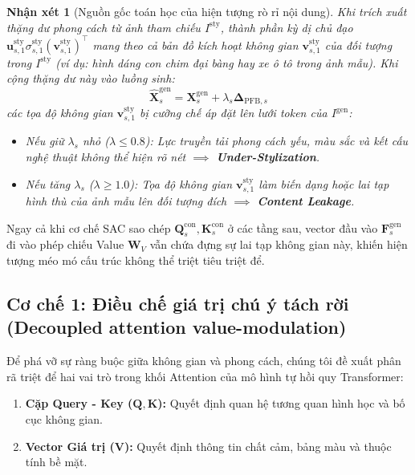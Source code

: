 \documentclass[10pt,twocolumn,letterpaper]{article}
\newtheorem{remark}{Nhận xét}
\begin{document}
\begin{remark}[Nguồn gốc toán học của hiện tượng rò rỉ nội dung]
Khi trích xuất thặng dư phong cách từ ảnh tham chiếu $I^{\text{sty}}$, thành phần kỳ dị chủ đạo $\mathbf{u}_{s, 1}^{\text{sty}} \sigma_{s, 1}^{\text{sty}} (\mathbf{v}_{s, 1}^{\text{sty}})^\top$ mang theo cả bản đồ kích hoạt không gian $\mathbf{v}_{s, 1}^{\text{sty}}$ của đối tượng trong $I^{\text{sty}}$ (ví dụ: hình dáng con chim đại bàng hay xe ô tô trong ảnh mẫu). Khi cộng thặng dư này vào luồng sinh:
\begin{equation}
\widehat{\mathbf{X}}_s^{\text{gen}} = \mathbf{X}_s^{\text{gen}} + \lambda_s \boldsymbol{\Delta}_{\text{PFB}, s}
\end{equation}
các tọa độ không gian $\mathbf{v}_{s, 1}^{\text{sty}}$ bị cưỡng chế áp đặt lên lưới token của $I^{\text{gen}}$:
\begin{itemize}
    \item Nếu giữ $\lambda_s$ nhỏ ($\lambda \le 0.8$): Lực truyền tải phong cách yếu, màu sắc và kết cấu nghệ thuật không thể hiện rõ nét $\implies$ \textbf{Under-Stylization}.
    \item Nếu tăng $\lambda_s$ ($\lambda \ge 1.0$): Tọa độ không gian $\mathbf{v}_{s, 1}^{\text{sty}}$ làm biến dạng hoặc lai tạp hình thù của ảnh mẫu lên đối tượng đích $\implies$ \textbf{Content Leakage}.
\end{itemize}
\end{remark}

Ngay cả khi cơ chế SAC sao chép $\mathbf{Q}_s^{\text{con}}, \mathbf{K}_s^{\text{con}}$ ở các tầng sau, vector đầu vào $\mathbf{F}_s^{\text{gen}}$ đi vào phép chiếu Value $\mathbf{W}_V$ vẫn chứa đựng sự lai tạp không gian này, khiến hiện tượng méo mó cấu trúc không thể triệt tiêu triệt để.

\subsection{Cơ chế 1: Điều chế giá trị chú ý tách rời (Decoupled attention value-modulation)}
\label{subsec:vmod}

Để phá vỡ sự ràng buộc giữa không gian và phong cách, chúng tôi đề xuất phân rã triệt để hai vai trò trong khối Attention của mô hình tự hồi quy Transformer:
\begin{enumerate}
    \item \textbf{Cặp Query - Key ($\mathbf{Q}, \mathbf{K}$):} Quyết định quan hệ tương quan hình học và bố cục không gian.
    \item \textbf{Vector Giá trị ($\mathbf{V}$):} Quyết định thông tin chất cảm, bảng màu và thuộc tính bề mặt.
\end{enumerate}
\end{document}
